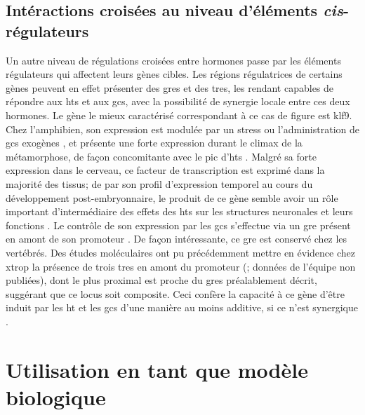 \documentclass[../main.tex]{subfiles}
\begin{document}
\subsection{Intéractions croisées au niveau d'éléments \textit{cis}-régulateurs}
Un autre niveau de régulations croisées entre hormones passe par les éléments régulateurs qui affectent leurs gènes cibles.
Les régions régulatrices de certains gènes peuvent en effet présenter des \glspl{gre} et des \glspl{tre}, les rendant capables de répondre aux \glspl{ht} et aux \glspl{gc}, avec la possibilité de synergie locale entre ces deux hormones.
Le gène le mieux caractérisé correspondant à ce cas de figure est \gls{klf9}.
Chez l'amphibien, son expression est modulée par un stress ou l'administration de \glspl{gc} exogènes \citep{Bonett2009}, et présente une forte expression durant le climax de la métamorphose, de façon concomitante avec le pic d'\glspl{ht} \citep{Das2009}.
Malgré sa forte expression dans le cerveau, ce facteur de transcription est exprimé dans la majorité des tissus; de par son profil d'expression temporel au cours du développement post-embryonnaire, le produit de ce gène semble avoir un rôle important d'intermédiaire des effets des \glspl{ht} sur les structures neuronales et leurs fonctions \citep{Denver1999,Cayrou2002}.
Le contrôle de son expression par les \glspl{gc} s'effectue via un \gls{gre} présent en amont de son promoteur \citep{Bagamasbad2012}.
De façon intéressante, ce \gls{gre} est conservé chez les vertébrés.
Des études moléculaires ont pu précédemment mettre en évidence chez \gls{xtrop} la présence de trois \glspl{tre} en amont du promoteur (\citealp{Furlow2002}; données de l'équipe non publiées), dont le plus proximal est proche du \glspl{gre} préalablement décrit, suggérant que ce locus soit composite.
Ceci confère la capacité à ce gène d'être induit par les \gls{ht} et les \glspl{gc} d'une manière au moins additive, si ce n'est synergique \citep{Bonett2010}.




\section{Utilisation en tant que modèle biologique}
\end{document}

